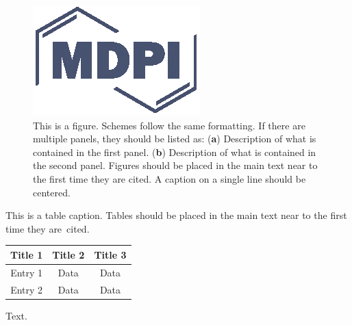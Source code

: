\begin{paracol}{2}
\begin{figure}[H]
\includegraphics[width=10.5 cm]{Definitions/logo-mdpi}
\caption{This is a figure. Schemes follow the same formatting. If there are multiple panels, they should be listed as: (\textbf{a}) Description of what is contained in the first panel. (\textbf{b}) Description of what is contained in the second panel. Figures should be placed in the main text near to the first time they are cited. A caption on a single line should be centered.\label{fig1}}
\end{figure}   

\begin{specialtable}[htbp] 
\caption{This is a table caption. Tables should be placed in the main text near to the first time they are~cited.\label{tab1}}
\begin{tabular}{ccc}
\toprule
\textbf{Title 1}	& \textbf{Title 2}	& \textbf{Title 3}\\
\midrule
Entry 1		& Data			& Data\\
Entry 2		& Data			& Data\\
\bottomrule
\end{tabular}
\end{specialtable}


Text.


\end{paracol}
